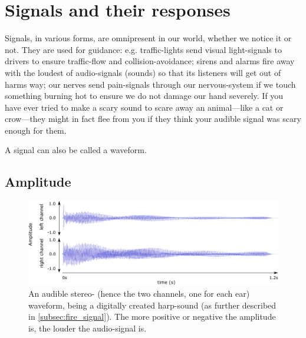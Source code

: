 \section{Signals and their responses}






Signals, in various forms, are omnipresent in our world, whether we notice it or not. They are used for guidance: e.g. traffic-lights send visual light-signals to drivers to ensure traffic-flow and collision-avoidance; sirens and alarms fire away with the loudest of audio-signals (sounds) so that its listeners will get out of harms way; our nerves send pain-signals through our nervous-system if we touch something burning hot to ensure we do not damage our hand severely. If you have ever tried to make a scary sound to scare away an animal—like a cat or crow—they might in fact flee from you if they think your audible signal was scary enough for them.

A signal can also be called a waveform.

	\subsection{Amplitude}
	\begin{figure}[h!]
		\centering
		\includegraphics[width=\linewidth]{Assets/DocSegments/Chapters/Background/Figures/Illustrations/waveform.pdf}
		\caption[An audible waveform explained.]{An audible stereo- (hence the two channels, one for each ear) waveform, being a digitally created harp-sound (as further described in \ref{subsec:fire_signal}). The more positive or negative the amplitude is, the louder the audio-signal is.}
		\label{fig:waveform}
	\end{figure}


